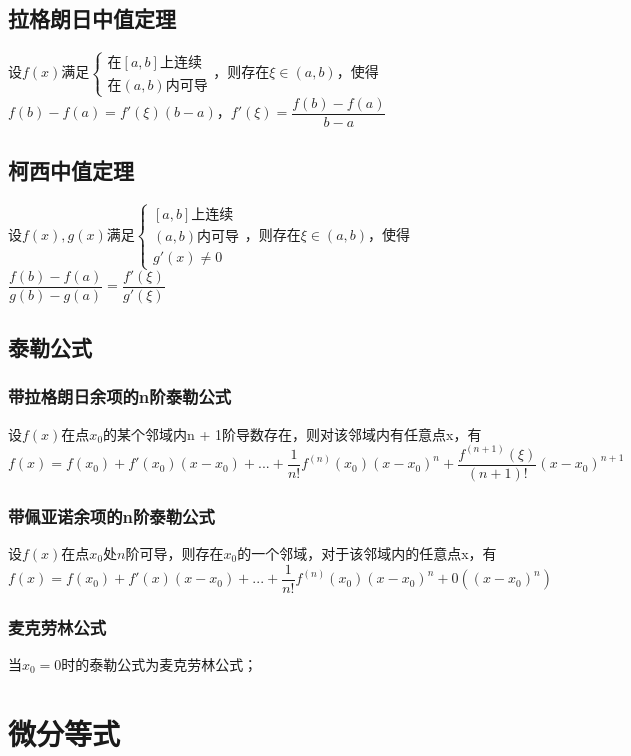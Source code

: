 \subsection{拉格朗日中值定理}
设\(f(x)\)满足\(\begin{cases}
\text{在}[a, b]\text{上连续} \\ 
\text{在}(a, b)\text{内可导}
\end{cases}\)，则存在\(\xi \in (a, b)\)，使得\(f(b) - f(a) = f'(\xi)(b - a)\)，\(f'(\xi) = \dfrac{f(b) - f(a)}{b - a}\)

\subsection{柯西中值定理}
设\(f(x), g(x)\)满足\(\begin{cases}
[a, b]\text{上连续} \\ 
(a, b)\text{内可导} \\ 
g'(x) \neq 0
\end{cases}\)，则存在\(\xi \in (a, b)\)，使得\(\dfrac{f(b) - f(a)}{g(b) - g(a)} = \dfrac{f'(\xi)}{g'(\xi)}\)

\subsection{泰勒公式}

\subsubsection{带拉格朗日余项的n阶泰勒公式}
设\(f(x)\)在点\(x_0\)的某个邻域内n + 1阶导数存在，则对该邻域内有任意点x，有\[f(x) = f(x_0) + f'(x_0)(x - x_0) + ... + \dfrac{1}{n!}f^{(n)}(x_0)(x - x_0)^n + \dfrac{f^{(n + 1)}(\xi)}{(n + 1)!}(x - x_0)^{n + 1}\]

\subsubsection{带佩亚诺余项的n阶泰勒公式}
设\(f(x)\)在点\(x_0\)处\(n\)阶可导，则存在\(x_0\)的一个邻域，对于该邻域内的任意点x，有\[f(x) = f(x_0) + f'(x)(x - x_0) + ... + \dfrac{1}{n!}f^{(n)}(x_0)(x - x_0)^n + 0((x - x_0)^n)\]

\subsubsection{麦克劳林公式}
当\(x_0 = 0\)时的泰勒公式为麦克劳林公式；


\section{微分等式}

